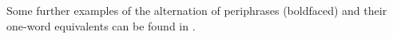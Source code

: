 \documentclass[output=paper,colorlinks,citecolor=brown]{langscibook}
\begin{document}
\largerpage

Some further examples of the alternation of periphrases (boldfaced) and their one-word equivalents can be found in  .


\end{document}
